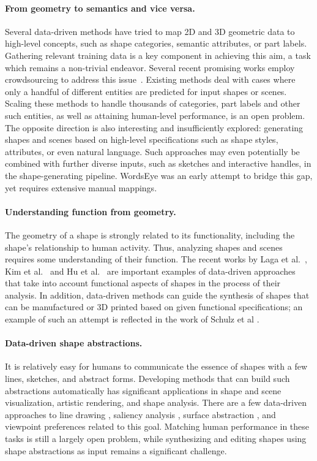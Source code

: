 \paragraph*{From geometry to semantics and vice versa.}
Several data-driven methods have tried to map 2D and 3D geometric data to high-level concepts, such as shape categories, semantic attributes, or part labels.
Gathering relevant training data is a key component in achieving this aim, a task which remains a non-trivial endeavor.  Several recent promising works employ crowdsourcing to address this issue~\cite{Chen:2009:BMS,Chaudhuri:2013:ACC,lun:style:2015,liu:style:2015,Yumer:2015:SSE}.  Existing methods deal with cases where only a handful of different entities are predicted for input shapes or scenes.
Scaling these methods to handle thousands of categories, part labels and other such entities, as well as attaining human-level performance, is an open problem.
The opposite direction is also interesting and insufficiently explored: generating shapes and scenes based on high-level specifications such as shape styles, attributes, or even natural language.  Such approaches may even potentially be combined with further diverse inputs, such as sketches and interactive handles, in the shape-generating pipeline. WordsEye \cite{Coyne:2001:WAT} was an early attempt to bridge this gap, yet requires extensive manual mappings.

\paragraph*{Understanding function from geometry.}
The geometry of a shape is strongly related to its functionality, including the shape's relationship to human activity. Thus, analyzing shapes and scenes requires some understanding of their function. The recent works by Laga et al.~\cite{Laga:2013:GCS}, Kim et al.~\cite{Kim14} and Hu et al.~\cite{hu:icon:2015} are important
examples of data-driven approaches that take into account functional aspects of shapes in the process of their analysis.
In addition, data-driven methods can guide the synthesis of shapes that can be manufactured or 3D printed based on given functional specifications; an example of such an attempt is reflected in the work of Schulz et al \cite{Schulz:2014:DFE}.


\paragraph*{Data-driven shape abstractions.}
It is relatively easy for humans to communicate the essence of shapes with a few lines, sketches, and abstract forms. Developing methods that can build such abstractions automatically has significant applications in shape and scene visualization, artistic rendering, and shape analysis. There are a few data-driven approaches to line drawing \cite{Cole:2008:WDP,Kalogerakis:2009:DDC,Kalogerakis:2012:LHP}, saliency analysis \cite{Chen:2012:SPO}, surface abstraction \cite{Yumer:2012:CSC}, and viewpoint preferences \cite{Secord:2011:PMO} related to this goal. Matching human performance in these tasks is still a largely open problem, while synthesizing and editing shapes using shape abstractions as input remains a significant challenge.

